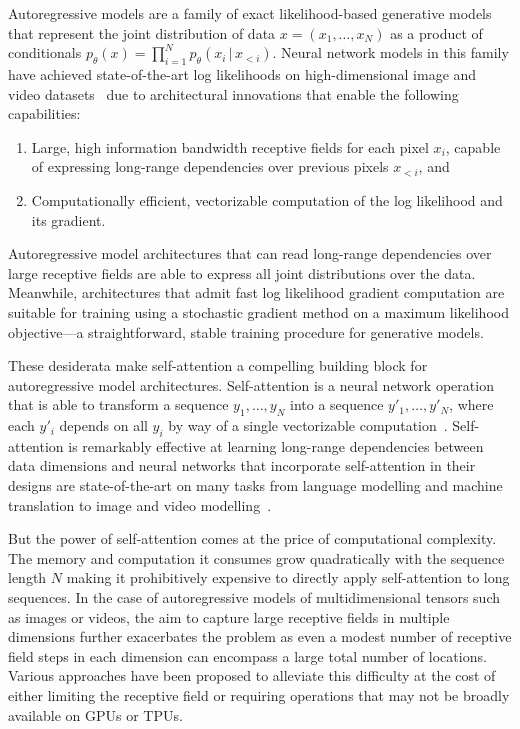 \documentclass{article} \usepackage{iclr2020_conference,times}
\begin{document}
Autoregressive models are a family of exact likelihood-based generative models that represent the joint distribution of data $x = (x_1, \dotsc, x_N)$ as a product of conditionals $p_\theta(x) = \prod_{i=1}^N p_\theta(x_i \,|\, x_{<i})$.
Neural network models in this family have achieved state-of-the-art log likelihoods on high-dimensional image and video datasets~\citep{oord2016pixel,chen2018pixelsnail,menick2018generating,parmar2018image,child2019generating,weissenborn2019scaling,salimans2017pixelcnn++,kalchbrenner2017video,uria2016neural,parikh2016decomposable,theis2015generative,oord2016conditional} due to architectural innovations that enable the following capabilities:
\begin{enumerate}
    \item Large, high information bandwidth receptive fields for each pixel $x_i$, capable of expressing long-range dependencies over previous pixels $x_{<i}$, and
    \item Computationally efficient, vectorizable computation of the log likelihood and its gradient.
\end{enumerate}
Autoregressive model architectures that can read long-range dependencies over large receptive fields are able to express all joint distributions over the data. Meanwhile, architectures that admit fast log likelihood gradient computation are suitable for training using a stochastic gradient method on a maximum likelihood objective---a straightforward, stable training procedure for generative models.

These desiderata make self-attention a compelling building block for autoregressive model architectures. Self-attention is a neural network operation that is able to transform a sequence $y_1, \dotsc, y_N$ into a sequence $y'_1, \dotsc, y'_N$, where each $y'_i$ depends on all $y_i$ by way of a single vectorizable computation~\citep{vaswani2017attention}. Self-attention is remarkably effective at learning long-range dependencies between data dimensions and neural networks that incorporate self-attention in their designs are state-of-the-art on many tasks from language modelling and machine translation to image and video modelling~\citep{parmar2018image,child2019generating}.

But the power of self-attention comes at the price of computational complexity. The memory and computation it consumes grow quadratically with the sequence length $N$ making it prohibitively expensive to directly apply self-attention to long sequences. In the case of autoregressive models of multidimensional tensors such as images or videos, the aim to capture large receptive fields in multiple dimensions further exacerbates the problem as even a modest number of receptive field steps in each dimension can encompass a large total number of locations. Various approaches have been proposed to alleviate this difficulty at the cost of either limiting the receptive field or requiring operations that may not be broadly available on GPUs or TPUs.
\end{document}
